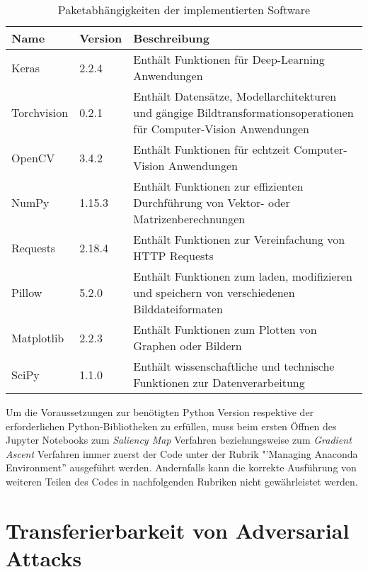 \begin{table}
	\centering
	\begin{tabular}{|l|l|p{10.4cm}|}
		\hline 
		Name & Version & Beschreibung \\ 
		\hline\hline 
		Keras& 2.2.4  & Enthält Funktionen für Deep-Learning Anwendungen \cite{noauthor_home_nodate} \\ 
		\hline 
		Torchvision& 0.2.1 & Enthält Datensätze, Modellarchitekturen und gängige Bildtransformationsoperationen für Computer-Vision Anwendungen \cite{team_torchvision:_nodate} \\ 
		\hline 
		OpenCV& 3.4.2  & Enthält Funktionen für echtzeit Computer-Vision Anwendungen \cite{noauthor_opencv_nodate} \\ 
		\hline 
		NumPy&  1.15.3& Enthält Funktionen zur effizienten Durchführung von Vektor- oder Matrizenberechnungen \cite{noauthor_numpy_nodate} \\ 
		\hline 
		Requests& 2.18.4 & Enthält Funktionen zur Vereinfachung von HTTP Requests \cite{noauthor_requests:_nodate} \\ 
		\hline 
		Pillow& 5.2.0 & Enthält Funktionen zum laden, modifizieren und speichern von verschiedenen Bilddateiformaten \cite{noauthor_pillow_nodate} \\ 
		\hline 
		Matplotlib& 2.2.3 & Enthält Funktionen zum Plotten von Graphen oder Bildern \cite{noauthor_matplotlib:_nodate} \\ 
		\hline 
		SciPy& 1.1.0  & Enthält wissenschaftliche und technische Funktionen zur Datenverarbeitung \cite{noauthor_scipy.org_nodate} \\ 
		\hline 
	\end{tabular} 
	\caption{Paketabhängigkeiten der implementierten Software}
	\label{tab:parameter}
\end{table}

Um die Voraussetzungen zur benötigten Python Version respektive der erforderlichen Python-Bibliotheken zu erfüllen, muss beim ersten Öffnen des Jupyter Notebooks zum \textit{Saliency Map} Verfahren beziehungsweise zum \textit{Gradient Ascent} Verfahren immer zuerst der Code unter der Rubrik "'Managing Anaconda Environment” ausgeführt werden. Andernfalls kann die korrekte Ausführung von weiteren Teilen des Codes in nachfolgenden Rubriken nicht gewährleistet werden.

\section{Transferierbarkeit von Adversarial Attacks}


